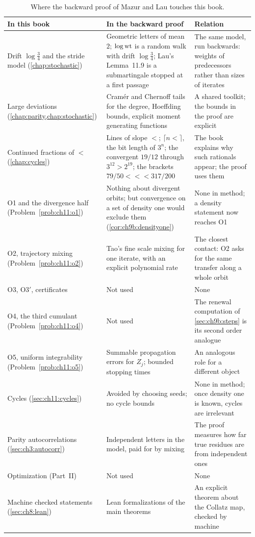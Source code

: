 \begin{table}[t]
\centering\footnotesize
\caption{Where the backward proof of Mazur and Lau touches this book.}
\label{tab:ch9b:book}
\begin{tabular}{@{}>{\raggedright}p{}>{\raggedright}p{}>{\raggedright\arraybackslash}p{}@{}}
\toprule
In this book & In the backward proof & Relation \\
\midrule
Drift $\log\frac34$ and the stride model (\cref{chap:stochastic}) & Geometric letters of mean $2$; $\log\operatorname{wt}$ is a random walk with drift $\log\frac34$; Lau's Lemma~11.9 is a submartingale stopped at a first passage & The same model, run backwards: weights of predecessors rather than sizes of iterates \\
Large deviations (\cref{chap:parity,chap:stochastic}) & Cram\'er and Chernoff tails for the degree, Hoeffding bounds, explicit moment generating functions & A shared toolkit; the bounds in the proof are explicit \\
Continued fractions of $\lt$ (\cref{chap:cycles}) & Lines of slope $\lt$; $\lceil n\lt\rceil$, the bit length of $3^n$; the convergent $19/12$ through $3^{12}>2^{19}$; the brackets $79/50<\lt<317/200$ & The book explains why such rationals appear; the proof uses them \\
O1 and the divergence half (Problem~\ref{prob:ch11:o1}) & Nothing about divergent orbits; but convergence on a set of density one would exclude them (\cref{cor:ch9b:densityone}) & None in method; a density statement now reaches O1 \\
O2, trajectory mixing (Problem~\ref{prob:ch11:o2}) & Tao's fine scale mixing for one iterate, with an explicit polynomial rate & The closest contact: O2 asks for the same transfer along a whole orbit \\
O3, O3$'$, certificates & Not used & None \\
O4, the third cumulant (Problem~\ref{prob:ch11:o4}) & Not used & The renewal computation of \cref{sec:ch9b:steps} is its second order analogue \\
O5, uniform integrability (Problem~\ref{prob:ch11:o5}) & Summable propagation errors for $Z_j$; bounded stopping times & An analogous role for a different object \\
Cycles (\cref{sec:ch11:cycles}) & Avoided by choosing seeds; no cycle bounds & None in method; once density one is known, cycles are irrelevant \\
Parity autocorrelations (\cref{sec:ch3:autocorr}) & Independent letters in the model, paid for by mixing & The proof measures how far true residues are from independent ones \\
Optimization (Part~II) & Not used & None \\
Machine checked statements (\cref{sec:ch8:lean}) & Lean formalizations of the main theorems & An explicit theorem about the Collatz map, checked by machine \\
\bottomrule
\end{tabular}
\end{table}

